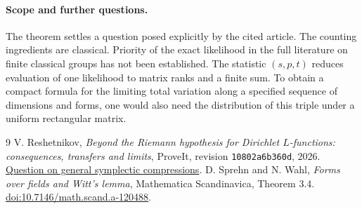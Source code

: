 \documentclass[10pt]{article}
\begin{document}
\paragraph{Scope and further questions.}
The theorem settles a question posed explicitly by the cited article. The counting ingredients are classical. Priority of the exact likelihood in the full literature on finite classical groups has not been established. The statistic $(s,p,t)$ reduces evaluation of one likelihood to matrix ranks and a finite sum. To obtain a compact formula for the limiting total variation along a specified sequence of dimensions and forms, one would also need the distribution of this triple under a uniform rectangular matrix.

\begin{thebibliography}{9}
V. Reshetnikov, \emph{Beyond the Riemann hypothesis for Dirichlet $L$-functions: consequences, transfers and limits}, ProveIt, revision \texttt{10802a6b360d}, 2026.
\href{https://github.com/VladimirReshetnikov/ProveIt/blob/10802a6b360d5cdce48698261bc305e57a934b1f/Analysis/GeneralizedRiemannHypothesis/Article/sections/spn.tex\#L3156-L3161}{Question on general symplectic compressions}.
D. Sprehn and N. Wahl, \emph{Forms over fields and Witt's lemma}, Mathematica Scandinavica, Theorem 3.4.
\href{https://doi.org/10.7146/math.scand.a-120488}{doi:10.7146/math.scand.a-120488}.
\end{thebibliography}
\end{document}
